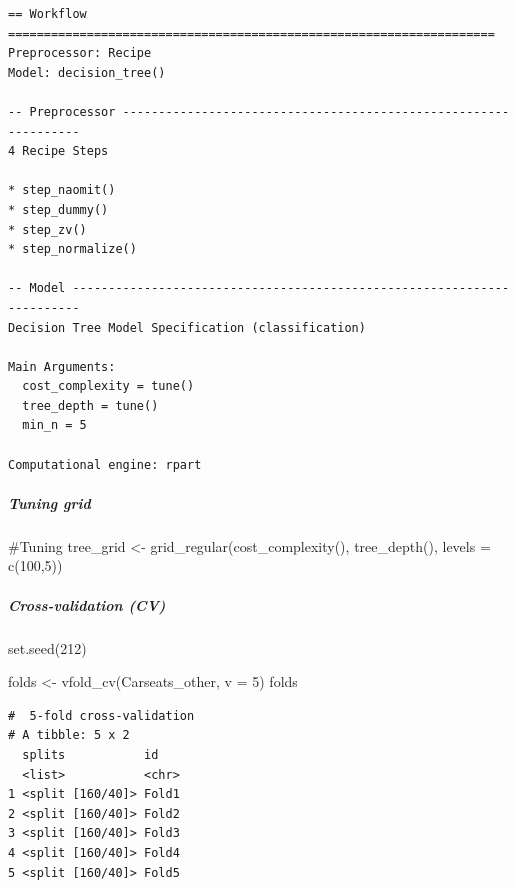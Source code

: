 \documentclass[
]{article}
\let\oldsubparagraph\subparagraph
\renewcommand{\subparagraph}[1]{\oldsubparagraph{#1}\mbox{}}
\newenvironment{Shaded}{\begin{snugshade}}{\end{snugshade}}
\newcommand{\AttributeTok}[1]{\textcolor[rgb]{0.40,0.45,0.13}{#1}}
\newcommand{\CommentTok}[1]{\textcolor[rgb]{0.37,0.37,0.37}{#1}}
\newcommand{\DecValTok}[1]{\textcolor[rgb]{0.68,0.00,0.00}{#1}}
\newcommand{\FunctionTok}[1]{\textcolor[rgb]{0.28,0.35,0.67}{#1}}
\newcommand{\NormalTok}[1]{\textcolor[rgb]{0.00,0.23,0.31}{#1}}
\newcommand{\OtherTok}[1]{\textcolor[rgb]{0.00,0.23,0.31}{#1}}
\begin{document}
\begin{verbatim}
== Workflow ====================================================================
Preprocessor: Recipe
Model: decision_tree()

-- Preprocessor ----------------------------------------------------------------
4 Recipe Steps

* step_naomit()
* step_dummy()
* step_zv()
* step_normalize()

-- Model -----------------------------------------------------------------------
Decision Tree Model Specification (classification)

Main Arguments:
  cost_complexity = tune()
  tree_depth = tune()
  min_n = 5

Computational engine: rpart 
\end{verbatim}

\hypertarget{tuning-grid-1}{%
\subparagraph{Tuning grid}\label{tuning-grid-1}}

\begin{Shaded}
\begin{Highlighting}[]
\CommentTok{\#Tuning}
\NormalTok{tree\_grid }\OtherTok{\textless{}{-}} \FunctionTok{grid\_regular}\NormalTok{(}\FunctionTok{cost\_complexity}\NormalTok{(),}
                          \FunctionTok{tree\_depth}\NormalTok{(),}
                          \AttributeTok{levels =} \FunctionTok{c}\NormalTok{(}\DecValTok{100}\NormalTok{,}\DecValTok{5}\NormalTok{))}
\end{Highlighting}
\end{Shaded}

\hypertarget{cross-validation-cv}{%
\subparagraph{Cross-validation (CV)}\label{cross-validation-cv}}

\begin{Shaded}
\begin{Highlighting}[]
\FunctionTok{set.seed}\NormalTok{(}\DecValTok{212}\NormalTok{)}

\NormalTok{folds }\OtherTok{\textless{}{-}} \FunctionTok{vfold\_cv}\NormalTok{(Carseats\_other, }\AttributeTok{v =} \DecValTok{5}\NormalTok{)}
\NormalTok{folds}
\end{Highlighting}
\end{Shaded}

\begin{verbatim}
#  5-fold cross-validation 
# A tibble: 5 x 2
  splits           id   
  <list>           <chr>
1 <split [160/40]> Fold1
2 <split [160/40]> Fold2
3 <split [160/40]> Fold3
4 <split [160/40]> Fold4
5 <split [160/40]> Fold5
\end{verbatim}
\end{document}
